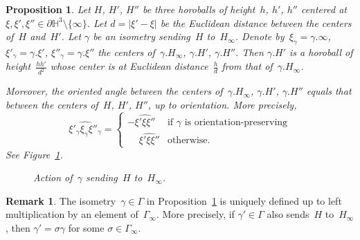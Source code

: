 \documentclass[11pt,reqno]{amsart}
\newtheorem{proposition}[theorem]{Proposition}
\theoremstyle{definition}
\newtheorem{remark}[theorem]{Remark}
\numberwithin{equation}{section}
\newcommand{\HH}{{\mathbb H}}
\numberwithin{equation}{section}
\begin{document}
\begin{proposition} \label{prop:tangent}
Let $H$, $H'$, $H''$ be three horoballs of height~$h$, $h'$, $h''$ centered at~$\xi, \xi', \xi'' \in \partial \HH^3 \setminus \{ \infty\}$.
Let $d=|\xi'-\xi|$ be the Euclidean distance between the centers of~$H$ and~$H'$.
Let $\gamma$ be an isometry sending~$H$ to~$H_\infty$.
Denote by~$\xi_\gamma=\gamma.\infty$, $\xi'_\gamma=\gamma.\xi'$, $\xi''_\gamma=\gamma.\xi''$ the centers of~$\gamma.H_\infty$, $\gamma.H'$, $\gamma.H''$.
Then $\gamma.H'$ is a horoball of height~$\frac{hh'}{d^2}$ whose center is at Euclidean distance~$\frac{h}{d}$ from that of~$\gamma.H_\infty$.


\clearpage


Moreover, the oriented angle between the centers of~$\gamma.H_\infty$, $\gamma.H'$, $\gamma.H''$ equals that between the centers of~$H$, $H'$, $H''$, up to orientation.
More precisely, 
\[
\widehat{\xi'_\gamma \xi_\gamma \xi''_\gamma} = 
\begin{cases}
- \widehat{\xi' \xi \xi''} & \text{if } \gamma \text{ is orientation-preserving} \\
\phantom{-} \widehat{\xi' \xi \xi''} & \text{otherwise}.
\end{cases}
\]
See Figure~\ref{fig:gamma}.



\begin{figure}[htbp!]
\centering
\vspace*{-0.7cm}
\hspace*{-0.5cm}
\def\svgwidth{0.75\textheight}

\caption{Action of~$\gamma$ sending~$H$ to~$H_\infty$.} \label{fig:gamma}
\end{figure}
\end{proposition}

\begin{remark}
The isometry~$\gamma \in \Gamma$ in Proposition~\ref{prop:tangent} is uniquely defined up to left multiplication by an element of~$\Gamma_\infty$.
More precisely, if $\gamma' \in \Gamma$ also sends~$H$ to~$H_\infty$, then $\gamma'=\sigma \gamma$ for some $\sigma \in \Gamma_\infty$.
\end{remark}
\end{document}
